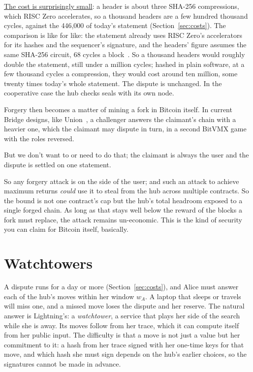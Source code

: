 \documentclass[11pt]{article}
\begin{document}
\underline{The cost is surprisingly small}: a header is about three SHA-256 compressions, which RISC Zero accelerates, so a thousand headers are a few hundred thousand cycles, against the
446,000 of today's statement (Section~\ref{sec:costs}). The comparison
is like for like: the statement already uses RISC Zero's accelerators
for its hashes and the sequencer's signature, and the headers' figure
assumes the same SHA-256 circuit, 68 cycles a block~\cite{risc0accel}.
So a thousand headers would roughly double the statement, still
under a million cycles; hashed in plain software, at a few thousand
cycles a compression, they would cost around ten million, some twenty
times today's whole statement. The dispute is unchanged. In the cooperative case the hub checks seals with its own node.

Forgery then becomes a matter of mining a fork in Bitcoin itself. In current Bridge designs, like Union~\cite{union}, a challenger answers the claimant's chain with a
heavier one, which the claimant may dispute in turn, in a second BitVMX
game with the roles reversed.

But we don't want to or need to do that; the claimant is always the user and the dispute is settled on one statement.

So any forgery attack is on the side of the user; and such an attack to achieve maximum returns \emph{could} use it to steal from the hub across multiple contracts.
So the bound is not one contract's cap but
the hub's total headroom exposed to a single forged chain. As long as
that stays well below the reward of the blocks a fork must replace, the attack remains un-economic. This is the kind of security you can claim for Bitcoin itself, basically.

\section{Watchtowers}
\label{sec:watch}

A dispute runs for a day or more (Section~\ref{sec:costs}), and Alice must
answer each of the hub's moves within her window $w_A$. A laptop that sleeps
or travels will miss one, and a missed move loses the dispute and her
reserve. The natural answer is Lightning's: a \emph{watchtower}, a
service that plays her side of the search while she is away. Its moves
follow from her trace, which it can compute itself from her public
input. The difficulty is that a move is not just a value but her
commitment to it: a hash from her trace signed with her one-time keys
for that move, and which hash she must sign depends on the hub's earlier
choices, so the signatures cannot be made in advance.
\end{document}
